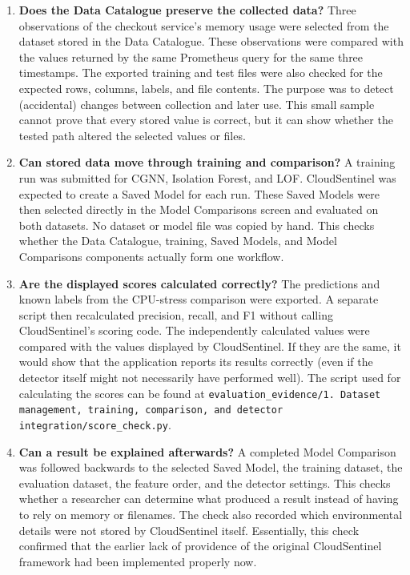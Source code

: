 \begin{enumerate}
    \item[\textbf{Check 1}] \textbf{Does the Data Catalogue preserve the collected data?}
    Three observations of the checkout service’s memory usage were selected from the dataset stored in the Data Catalogue. These observations were compared with the values returned by the same Prometheus query for the same three timestamps. The exported training and test files were also checked for the expected rows, columns, labels, and file contents. The purpose was to detect (accidental) changes between collection and later use. This small sample cannot prove that every stored value is correct, but it can show whether the tested path altered the selected values or files.

    \item[\textbf{Check 2}] \textbf{Can stored data move through training and comparison?}
    A training run was submitted for CGNN, Isolation Forest, and LOF. CloudSentinel was expected to create a Saved Model for each run. These Saved Models were then selected directly in the Model Comparisons screen and evaluated on both datasets. No dataset or model file was copied by hand. This checks whether the Data Catalogue, training, Saved Models, and Model Comparisons components actually form one workflow.

    \item[\textbf{Check 3}] \textbf{Are the displayed scores calculated correctly?}
    The predictions and known labels from the CPU-stress comparison were exported. A separate script then recalculated precision, recall, and F1 without calling CloudSentinel's scoring code. The independently calculated values were compared with the values displayed by CloudSentinel. If they are the same, it would show that the application reports its results correctly (even if the detector itself might not necessarily have performed well). The script used for calculating the scores can be found at \texttt{evaluation\_evidence/1. Dataset management, training, comparison, and detector integration/score\_check.py}.

    \item[\textbf{Check 4}] \textbf{Can a result be explained afterwards?}
    A completed Model Comparison was followed backwards to the selected Saved Model, the training dataset, the evaluation dataset, the feature order, and the detector settings. This checks whether a researcher can determine what produced a result instead of having to rely on memory or filenames. The check also recorded which environmental details were not stored by CloudSentinel itself. Essentially, this check confirmed that the earlier lack of providence of the original CloudSentinel framework had been implemented properly now.


\end{enumerate}
